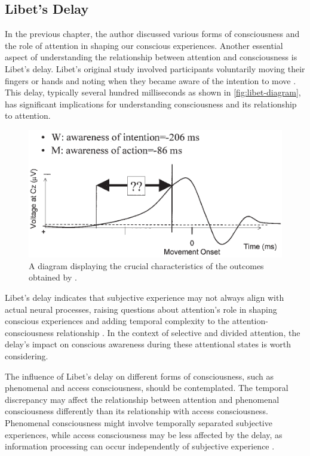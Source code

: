\documentclass[10pt]{article}
\begin{document}
\begin{sloppypar}
  \subsection{Libet’s Delay}
  \label{sec:libet}

  In the previous chapter, the author discussed various forms of consciousness and the role of attention in shaping our conscious experiences. Another essential aspect of understanding the relationship between attention and consciousness is Libet’s delay. Libet’s original study involved participants voluntarily moving their fingers or hands and noting when they became aware of the intention to move \citep{libet_time_1983}. This delay, typically several hundred milliseconds as shown in \autoref{fig:libet-diagram}, has significant implications for understanding consciousness and its relationship to attention.

  \begin{figure}[ht]
    \centering
    \includegraphics[width=\textwidth]{figures/libet.png}
    \caption[A diagram displaying the crucial characteristics of the outcomes obtained by Libet et al.]{A diagram displaying the crucial characteristics of the outcomes obtained by \cite{libet_time_1983} \citep{haggard_conscious_2001}.}
    \label{fig:libet-diagram}
  \end{figure}

  \newpage

  Libet’s delay indicates that subjective experience may not always align with actual neural processes, raising questions about attention’s role in shaping conscious experiences and adding temporal complexity to the attention-consciousness relationship \citep{dijksterhuis_goals_2010}. In the context of selective and divided attention, the delay’s impact on conscious awareness during these attentional states is worth considering.

  The influence of Libet’s delay on different forms of consciousness, such as phenomenal and access consciousness, should be contemplated. The temporal discrepancy may affect the relationship between attention and phenomenal consciousness differently than its relationship with access consciousness. Phenomenal consciousness might involve temporally separated subjective experiences, while access consciousness may be less affected by the delay, as information processing can occur independently of subjective experience \citep{dijksterhuis_goals_2010, kozuch_gorillas_2018}.


\end{sloppypar}
\end{document}
